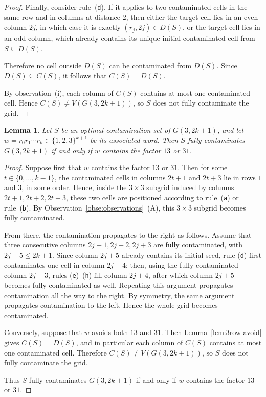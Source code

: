 \documentclass[letterpaper,12pt]{article}
\newtheorem{lemma}{Lemma}
\begin{document}
\begin{proof}
Finally, consider rule~\textup{(\texttt{d})}. If it applies to two contaminated cells in
the same row and in columns at distance \(2\), then either the target cell lies
in an even column \(2j\), in which case it is exactly \((r_j,2j)\in D(S)\), or
the target cell lies in an odd column, which already contains its unique
initial contaminated cell from \(S\subseteq D(S)\).

Therefore no cell outside \(D(S)\) can be contaminated from \(D(S)\). Since
\(D(S)\subseteq C(S)\), it follows that \(C(S)=D(S)\).

By observation~(i), each column of \(C(S)\) contains at most one contaminated
cell. Hence \(C(S)\neq V(G(3,2k+1))\), so \(S\) does not fully contaminate the
grid.\qedhere
\end{proof}

\begin{lemma}\label{lem:3row-factor}
Let \(S\) be an optimal contamination set of \(G(3,2k+1)\), and let
\(w=r_0r_1\cdots r_k\in\{1,2,3\}^{k+1}\) be its associated word. Then \(S\)
fully contaminates \(G(3,2k+1)\) if and only if \(w\) contains the factor
\(13\) or \(31\).
\end{lemma}

\begin{proof}
Suppose first that \(w\) contains the factor \(13\) or \(31\). Then for some
\(t\in\{0,\dots,k-1\}\), the contaminated cells in columns \(2t+1\) and
\(2t+3\) lie in rows \(1\) and \(3\), in some order. Hence, inside the
\(3\times 3\) subgrid induced by columns \(2t+1,2t+2,2t+3\), these two cells
are positioned according to rule~\textup{(\texttt{a})} or rule~\textup{(\texttt{b})}. By Observation~\ref{obse:observations}~(A), this \(3\times 3\) subgrid becomes fully
contaminated.

From there, the contamination propagates to the right as follows. Assume that
three consecutive columns \(2j+1,2j+2,2j+3\) are fully contaminated, with
\(2j+5\le 2k+1\). Since column \(2j+5\) already contains its initial seed, rule
\textup{(\texttt{d})} first contaminates one cell in column \(2j+4\); then, using the
fully contaminated column \(2j+3\), rules \textup{(\texttt{e})}--\textup{(\texttt{h})} fill
column \(2j+4\), after which column \(2j+5\) becomes fully contaminated as
well. Repeating this argument propagates contamination all the way to the
right. By symmetry, the same argument propagates contamination to the left.
Hence the whole grid becomes contaminated.

Conversely, suppose that \(w\) avoids both \(13\) and \(31\). Then
Lemma~\ref{lem:3row-avoid} gives \(C(S)=D(S)\), and in particular each column
of \(C(S)\) contains at most one contaminated cell. Therefore
\(C(S)\neq V(G(3,2k+1))\), so \(S\) does not fully contaminate the grid.

Thus \(S\) fully contaminates \(G(3,2k+1)\) if and only if \(w\) contains the
factor \(13\) or \(31\).\qedhere
\end{proof}
\end{document}
